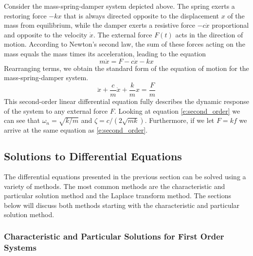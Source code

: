Consider the mass-spring-damper system depicted above. The spring exerts a restoring force $-kx$ that is always directed opposite to the displacement $x$ of the mass from equilibrium, while the damper exerts a resistive force $-c\dot{x}$ proportional and opposite to the velocity $\dot{x}$. The external force $F(t)$ acts in the direction of motion. According to Newton's second law, the sum of these forces acting on the mass equals the mass times its acceleration, leading to the equation 
\begin{equation}
m\ddot{x} = F - c\dot{x} - kx 
\end{equation}
Rearranging terms, we obtain the standard form of the equation of motion for the mass-spring-damper system.
\begin{equation}
\ddot{x} + \frac{c}{m}\dot{x} + \frac{k}{m}x = \frac{F}{m}
\end{equation}
This second-order linear differential equation fully describes the dynamic response of the system to any external force $F$. Looking at equation \ref{e:second_order} we can see that $\omega_n = \sqrt{k/m}$ and $\zeta = c/(2\sqrt{mk})$. Furthermore, if we let $F = kf$ we arrive at the same equation as \ref{e:second_order}.

\subsection{Solutions to Differential Equations}

The differential equations presented in the previous section can be solved using a variety of methods. The most common methods are the characteristic and particular solution method and the Laplace transform method. The sections below will discuss both methods starting with the characteristic and particular solution method.

\subsubsection{Characteristic and Particular Solutions for First Order Systems}

